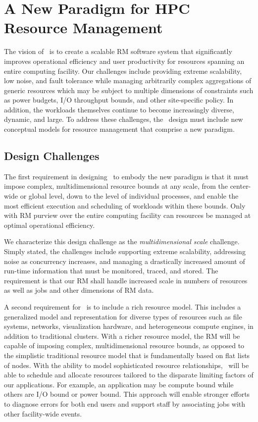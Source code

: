 \section{A New Paradigm for HPC Resource Management}
The vision of \flux\ is to create a scalable RM
software system that significantly improves
operational efficiency and user productivity
for resources spanning an entire
computing facility.
Our challenges include providing extreme
scalability, low noise, and fault tolerance while
managing arbitrarily complex aggregations of generic resources
which may be subject to multiple dimensions of constraints
such as power budgets, I/O throughput bounds, and other site-specific
policy.
In addition, the workloads themselves continue to become
increasingly diverse, dynamic, and large.
To address these challenges, the \flux\ design must include
new conceptual models for resource management
that comprise a new paradigm.

\subsection{Design Challenges}
\label{sect:challenges}

The first requirement in designing \flux\ to 
embody the new paradigm is that it must impose
complex, multidimensional resource bounds at
any scale, from the center-wide or global level,
down to the level of individual processes,
and enable the most efficient execution and
scheduling of workloads within these bounds.
Only with RM purview over the entire computing
facility can resources be managed at optimal operational efficiency.

We characterize this design challenge as the {\em multidimensional
scale} challenge.  Simply stated, the challenges include
supporting extreme scalability, addressing noise as concurrency
increases, and managing a drastically increased amount of
run-time information that must be monitored, traced, and stored.
The requirement is that our RM shall handle increased scale in
numbers of resources as well as jobs and other dimensions of RM data.

A second requirement for \flux\ is to include a rich resource model.
This includes a generalized model and representation for diverse
types of resources such as file systems, networks, visualization
hardware, and heterogeneous compute engines, in addition to
traditional clusters.
With a richer resource model, the RM will be capable of imposing
complex, multidimensional resource bounds, as opposed to the
simplistic traditional resource model that is fundamentally based on
flat lists of nodes.
With the ability to model sophisticated resource relationships,
\flux\ will be able to schedule and
allocate resources tailored to the disparate limiting
factors of our applications.  For example, an application may be
compute bound while others are I/O bound or power bound.
This approach will enable stronger efforts to diagnose errors
for both end users and support staff by associating jobs
with other facility-wide events.

